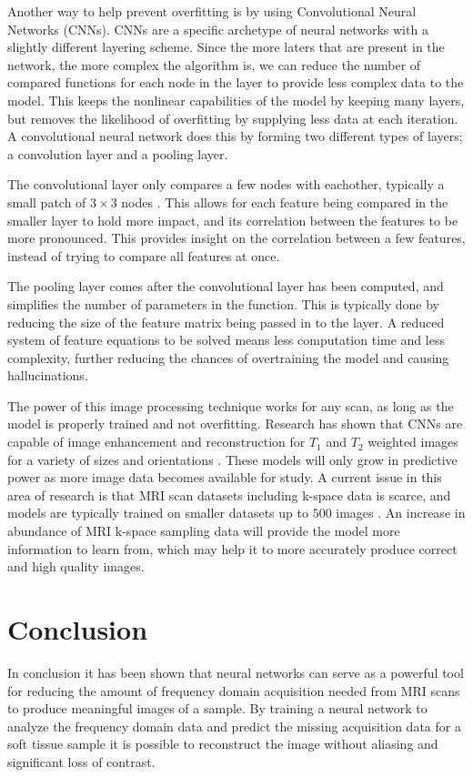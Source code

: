 \documentclass[14pt]{extreport}
\begin{document}
        Another way to help prevent overfitting is by using Convolutional Neural Networks (CNNs). CNNs are a specific archetype of neural networks with a slightly different layering scheme. Since the more laters that are present in the network, the more complex the algorithm is, we can reduce the number of compared functions for each node in the layer to provide less complex data to the model. This keeps the nonlinear capabilities of the model by keeping many layers, but removes the likelihood of overfitting by supplying less data at each iteration. A convolutional neural network does this by forming two different types of layers; a convolution layer and a pooling layer. 

        The convolutional layer only compares a few nodes with eachother, typically a small patch of $3\times3$ nodes \cite{Liu_Pan_Li_Chen_Tang_Lu_Wang_2018}. This allows for each feature being compared in the smaller layer to hold more impact, and its correlation between the features to be more pronounced. This provides insight on the correlation between a few features, instead of trying to compare all features at once.

        The pooling layer comes after the convolutional layer has been computed, and simplifies the number of parameters in the function. This is typically done by reducing the size of the feature matrix being passed in to the layer. A reduced system of feature equations to be solved means less computation time and less complexity, further reducing the chances of overtraining the model and causing hallucinations.


        The power of this image processing technique works for any scan, as long as the model is properly trained and not overfitting. Research has shown that CNNs are capable of image enhancement and reconstruction for $T_1$ and $T_2$ weighted images for a variety of sizes and orientations \cite{Wang_Su_Ying_Peng_Zhu_Liang_Feng_Liang_2016}. These models will only grow in predictive power as more image data becomes available for study. A current issue in this area of research is that MRI scan datasets including k-space data is scarce, and models are typically trained on smaller datasets up to $500$ images \cite{Wang_Su_Ying_Peng_Zhu_Liang_Feng_Liang_2016}. An increase in abundance of MRI k-space sampling data will provide the model more information to learn from, which may help it to more accurately produce correct and high quality images.
    
    \section*{Conclusion}
        In conclusion it has been shown that neural networks can serve as a powerful tool for reducing the amount of frequency domain acquisition needed from MRI scans to produce meaningful images of a sample. By training a neural network to analyze the frequency domain data and predict the missing acquisition data for a soft tissue sample it is possible to reconstruct the image without aliasing and significant loss of contrast. 
\end{document}
